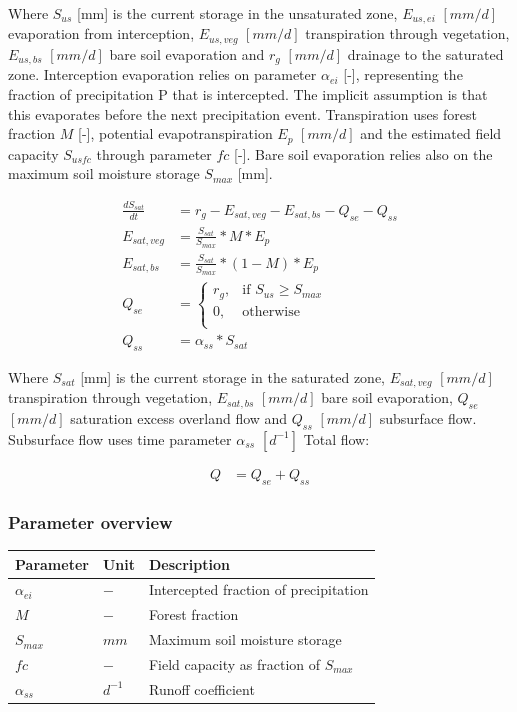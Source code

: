 Where $S_{us}$ [mm] is the current storage in the unsaturated zone, $E_{us,ei}$ $[mm/d]$ evaporation from interception, $E_{us,veg}$ $[mm/d]$ transpiration through vegetation, $E_{us,bs}$ $[mm/d]$ bare soil evaporation and $r_g$ $[mm/d]$ drainage to the saturated zone. Interception evaporation relies on parameter $\alpha_{ei}$ [-], representing the fraction of precipitation P that is intercepted. The implicit assumption is that this evaporates before the next precipitation event. Transpiration uses forest fraction $M$ [-], potential evapotranspiration $E_p$ $[mm/d]$ and the estimated field capacity $S_{usfc}$ through parameter $fc$ [-]. Bare soil evaporation relies also on the maximum soil moisture storage $S_{max}$ [mm]. 

\begin{align}
	\frac{dS_{sat}}{dt} &= r_g - E_{sat,veg}-E_{sat,bs} -Q_{se} - Q_{ss}\\
	E_{sat,veg} &= \frac{S_{sat}}{S_{max}}*M*E_p\\
	E_{sat,bs} &= \frac{S_{sat}}{S_{max}}*(1-M)*E_p\\
	Q_{se} &=\begin{cases}
		r_g, &\text{if } S_{us} \geq S_{max}\\
		0, & \text{otherwise} \\
	\end{cases}\\
	Q_{ss} &= \alpha_{ss}*S_{sat}
\end{align}

Where $S_{sat}$ [mm] is the current storage in the saturated zone, $E_{sat,veg}$ $[mm/d]$ transpiration through vegetation, $E_{sat,bs}$ $[mm/d]$ bare soil evaporation, $Q_{se}$ $[mm/d]$ saturation excess overland flow and $Q_{ss}$ $[mm/d]$ subsurface flow. Subsurface flow uses time parameter $\alpha_{ss}$ $[d^{-1}]$
Total flow:

\begin{align}
	Q &= Q_{se}+Q_{ss}
\end{align}

\subsubsection{Parameter overview}
\begin{table}[htbp]
  \centering
    \begin{tabular}{lll}
    \toprule
    Parameter & Unit  & Description \\
    \midrule
    $\alpha_{ei}$ & $-$   & Intercepted fraction of precipitation \\
    $M$   & $-$   & Forest fraction \\
    $S_{max}$ & $mm$  & Maximum soil moisture storage \\
    $fc$  & $-$   & Field capacity as fraction of $S_{max}$ \\
    $\alpha_{ss}$ & $d^{-1}$ & Runoff coefficient \\
    \bottomrule
    \end{tabular}%
  \label{tab:addlabel}%
\end{table}%

